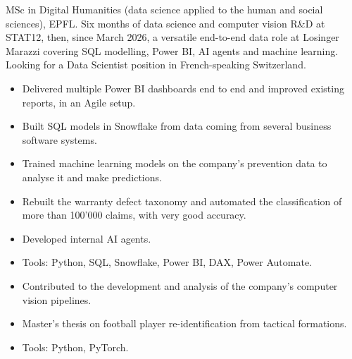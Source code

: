 



MSc in Digital Humanities (data science applied to the human and social sciences), EPFL. Six months of data
science and computer vision R\&D at STAT12, then, since March 2026, a versatile end-to-end data role at
Losinger Marazzi covering SQL modelling, Power BI, AI agents and machine learning. Looking for a Data
Scientist position in French-speaking Switzerland.

\begin{itemize}
  \item Delivered multiple Power BI dashboards end to end and improved existing reports, in an Agile setup.
  \item Built SQL models in Snowflake from data coming from several business software systems.
  \item Trained machine learning models on the company's prevention data to analyse it and make predictions.
  \item Rebuilt the warranty defect taxonomy and automated the classification of more than 100'000 claims, with very good accuracy.
  \item Developed internal AI agents.
  \item Tools: Python, SQL, Snowflake, Power BI, DAX, Power Automate.
\end{itemize}

\begin{itemize}
  \item Contributed to the development and analysis of the company's computer vision pipelines.
  \item Master's thesis on football player re-identification from tactical formations.
  \item Tools: Python, PyTorch.
\end{itemize}

